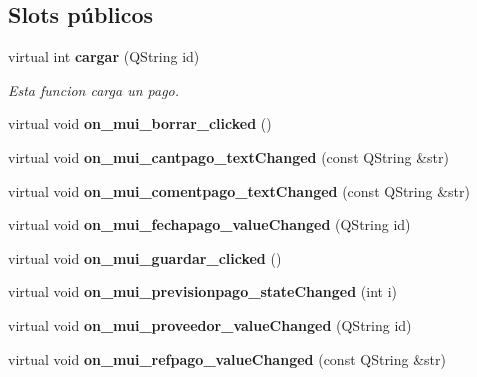 \subsection*{Slots p\'{u}blicos}
\begin{CompactItemize}
\item 
virtual int {\bf cargar} (QString id)\label{classPagoView_i0}

\begin{CompactList}\small\item\em Esta funcion carga un pago. \item\end{CompactList}\item 
virtual void {\bf on\_\-mui\_\-borrar\_\-clicked} ()\label{classPagoView_i1}

\item 
virtual void {\bf on\_\-mui\_\-cantpago\_\-text\-Changed} (const QString \&str)\label{classPagoView_i2}

\item 
virtual void {\bf on\_\-mui\_\-comentpago\_\-text\-Changed} (const QString \&str)\label{classPagoView_i3}

\item 
virtual void {\bf on\_\-mui\_\-fechapago\_\-value\-Changed} (QString id)\label{classPagoView_i4}

\item 
virtual void {\bf on\_\-mui\_\-guardar\_\-clicked} ()\label{classPagoView_i5}

\item 
virtual void {\bf on\_\-mui\_\-previsionpago\_\-state\-Changed} (int i)\label{classPagoView_i6}

\item 
virtual void {\bf on\_\-mui\_\-proveedor\_\-value\-Changed} (QString id)\label{classPagoView_i7}

\item 
virtual void {\bf on\_\-mui\_\-refpago\_\-value\-Changed} (const QString \&str)\label{classPagoView_i8}

\end{CompactItemize}
